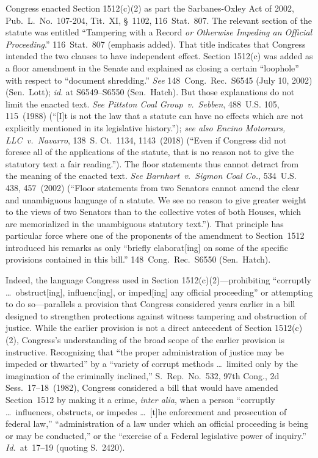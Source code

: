 Congress enacted Section 1512(c)(2) as part the Sarbanes-Oxley Act of 2002, Pub.\ L.~No.~107-204, Tit.~XI, \S~1102, 116~Stat.~807.
The relevant section of the statute was entitled ``Tampering with a Record \textit{or Otherwise Impeding an Official Proceeding}.''
116~Stat.~807 (emphasis added).
That title indicates that Congress intended the two clauses to have independent effect.
Section 1512(c) was added as a floor amendment in the Senate and explained as closing a certain ``loophole'' with respect to ``document shredding.''
\textit{See} 148~Cong.\ Rec.\ S6545 (July 10, 2002) (Sen.~Lott);
\textit{id}. at S6549--S6550 (Sen.~Hatch).
But those explanations do not limit the enacted text.
\textit{See Pittston Coal Group~v.\ Sebben}, 488~U.S. 105, 115~(1988) (``[I]t is not the law that a statute can have no effects which are not explicitly mentioned in its legislative history.'');
\textit{see also Encino Motorcars, LLC~v.\ Navarro}, 138~S. Ct.~1134, 1143~(2018) (``Even if Congress did not foresee all of the applications of the statute, that is no reason not to give the statutory text a fair reading.'').
The floor statements thus cannot detract from the meaning of the enacted text.
\textit{See Barnhart~v.\ Sigmon Coal Co.}, 534~U.S. 438, 457~(2002) (``Floor statements from two Senators cannot amend the clear and unambiguous language of a statute.
We see no reason to give greater weight to the views of two Senators than to the collective votes of both Houses, which are memorialized in the unambiguous statutory text.'').
That principle has particular force where one of the proponents of the amendment to Section~1512 introduced his remarks as only ``briefly elaborat[ing] on some of the specific provisions contained in this bill.''
148~Cong.\ Rec.\ S6550 (Sen.~Hatch).

Indeed, the language Congress used in Section 1512(c)(2)---prohibiting ``corruptly \dots\ obstruct[ing], influenc[ing], or imped[ing] any official proceeding'' or attempting to do so---parallels a provision that Congress considered years earlier in a bill designed to strengthen protections against witness tampering and obstruction of justice.
While the earlier provision is not a direct antecedent of Section 1512(c)(2), Congress's understanding of the broad scope of the earlier provision is instructive.
Recognizing that ``the proper administration of justice may be impeded or thwarted'' by a ``variety of corrupt methods \dots\ limited only by the imagination of the criminally inclined,'' S.~Rep.\ No.~532, 97th Cong., 2d Sess.~17--18~(1982), Congress considered a bill that would have amended Section~1512 by making it a crime, \textit{inter alia}, when a person ``corruptly \dots\ influences, obstructs, or impedes \dots\ [t]he enforcement and prosecution of federal law,'' ``administration of a law under which an official proceeding is being or may be conducted,'' or the ``exercise of a Federal legislative power of inquiry.'' \textit{Id.}~at~17--19 (quoting S.~2420).

